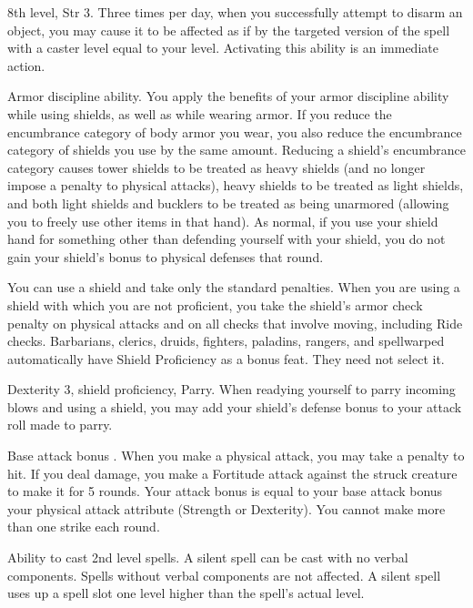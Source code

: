 \featpre 8th level, Str 3.
\featben Three times per day, when you successfully attempt to disarm an object, you may cause it to be affected as if by the targeted version of the  spell with a caster level equal to your level. Activating this ability is an immediate action.

\featpre Armor discipline ability.
\featben You apply the benefits of your armor discipline ability while using shields, as well as while wearing armor. If you reduce the encumbrance category of body armor you wear, you also reduce the encumbrance category of shields you use by the same amount. Reducing a shield's encumbrance category causes tower shields to be treated as heavy shields (and no longer impose a  penalty to physical attacks), heavy shields to be treated as light shields, and both light shields and bucklers to be treated as being unarmored (allowing you to freely use other items in that hand). As normal, if you use your shield hand for something other than defending yourself with your shield, you do not gain your shield's bonus to physical defenses that round.

 You can use a shield and take only the standard penalties.
 When you are using a shield with which you are not proficient, you take the shield's armor check penalty on physical attacks and on all checks that involve moving, including Ride checks.
 Barbarians, clerics, druids, fighters, paladins, rangers, and spellwarped automatically have Shield Proficiency as a bonus feat. They need not select it.

\featpres Dexterity 3, shield proficiency, Parry.
\featben When readying yourself to parry incoming blows and using a shield, you may add your shield's defense bonus to your attack roll made to parry.

\featpre Base attack bonus .
\featben When you make a physical attack, you may take a  penalty to hit. If you deal damage, you make a Fortitude attack against the struck creature to make it \sickened for 5 rounds. Your attack bonus is equal to your base attack bonus \add your physical attack attribute (Strength or Dexterity). You cannot make more than one strike each round.

 Ability to cast 2nd level spells.
 A silent spell can be cast with no verbal components. Spells without verbal components are not affected. A silent spell uses up a spell slot one level higher than the spell's actual level.

